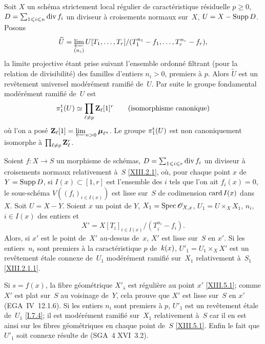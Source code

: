 \setcounter{subsection}{2}

\begin{corollaire}
\label{XIII.5.3} Soit $X$ un sch\'ema strictement local r\'egulier
de caract\'eristique r\'esiduelle $p\geq 0$, $D=\sum_{1\leq i\leq
n} \divisor f_i$ un diviseur \`a croisements normaux sur~$X$,
$U=X-\Supp D$. Posons
$$
\tilde U=\varprojlim_{(n_i)}
U[T_1,\dots,T_r]/(T_1^{n_1}-f_1,\dots,T_r^{n_r}-f_r),
$$
la limite projective \'etant prise suivant l'ensemble ordonn\'e
filtrant (pour la relation de divisibilit\'e) des familles d'entiers
$n_i>0$, premiers \`a $p$. Alors $\tilde U$ est un rev\^etement
universel mod\'er\'ement ramifi\'e de~$U$. Par suite le groupe
fondamental mod\'er\'ement ramifi\'e de~$U$ est
$$
\pi_1^{\tame}(U)\simeq \prod_{\ell\neq p} \ZZ_\ell [1]^r
\qquad \text{(isomorphisme canonique)}
$$
o\`u l'on a pos\'e
$\ZZ_\ell[1]=\varprojlim_{n>0}\bbmu_{\ell^n}$. Le groupe
$\pi_1^{\tame}(U)$ est non canoniquement isomorphe \`a $\prod_{\ell\neq p}
\ZZ_\ell^r$.
\label{indnot:mm}\end{corollaire}

\begin{proposition}
\label{XIII.5.4} Soient $f\colon X\to S$ un morphisme de
sch\'emas, $D=\sum_{1\leq i\leq r} \divisor f_i$ un diviseur \`a
croisements normaux relativement \`a~$S$ \eqref{XIII.2.1}, o\`u,
pour chaque point $x$ de~$Y=\Supp D$, si $I(x)\subset[1,r]$ est
l'ensemble des $i$ tels que l'on ait $f_i(x)=0$, le sous-sch\'ema
$V((f_i)_{i\in I(x)})$ est lisse sur~$S$ de codimension
$\card I(x)$
dans $X$. Soit $U=X-Y$. Soient $x$ un point de
$Y$, $X_1=\Spec\cal{O}_{X,x}$, $U_1=U\times_X X_1$, $n_i$, $i\in I(x)$
des entiers et
$$
X'=X[T_i]_{i\in I(x)}/(T_i^{n_i}-f_i).
$$
Alors, si $x'$ est le point de~$X'$ au-dessus de~$x$, $X'$ est lisse
sur~$S$ en $x'$. Si les entiers~$n_i$ sont premiers \`a la
caract\'eristique $p$ de~$\kres(x)$, $U'_1=U_1\times_X X'$ est un
rev\^etement \'etale connexe de~$U_1$ mod\'er\'ement
ramifi\'e sur~$X_1$ relativement \`a~$S_1$ \eqref{XIII.2.1.1}.
\end{proposition}

Si $s=f(x)$, la fibre g\'eom\'etrique $X'_{\bar{s}}$ est
r\'eguli\`ere au point $x'$ \eqref{XIII.5.1}; comme $X'$ est plat
sur~$S$ au voisinage de~$Y$, cela prouve que $X'$ est lisse sur~$S$ en
$x'$ (EGA~IV~12.1.6). Si les entiers $n_i$ sont premiers \`a $p$,
$U'_1$ est un rev\^etement \'etale de~$U_1$ \eqref{I.7.4}; il est
mod\'er\'ement ramifi\'e sur~$X_1$ relativement \`a~$S$ car il
en est ainsi sur les fibres g\'eom\'etriques en chaque point de~$S$
\eqref{XIII.5.1}. Enfin le fait que $U'_1$ soit connexe r\'esulte de
(SGA~4 XVI~3.2).

